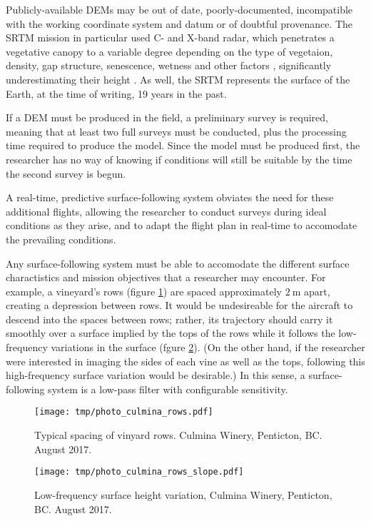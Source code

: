 \documentclass[doc]{apa6}
\begin{document}
Publicly-available DEMs may be out of date, poorly-documented, incompatible with the working coordinate system and datum or of doubtful provenance. The SRTM mission in particular used C- and X-band radar, which penetrates a vegetative canopy to a variable degree depending on the type of vegetaion, density, gap structure, senescence, wetness and other factors \parencite{Miliaresis2009}, significantly underestimating their height \parencite{Sexton2009}. As well, the SRTM represents the surface of the Earth, at the time of writing, 19 years in the past. 

If a DEM must be produced in the field, a preliminary survey is required, meaning that at least two full surveys must be conducted, plus the processing time required to produce the model. Since the model must be produced first, the researcher has no way of knowing if conditions will still be suitable by the time the second survey is begun. 

A real-time, predictive surface-following system obviates the need for these additional flights, allowing the researcher to conduct surveys during ideal conditions as they arise, and to adapt the flight plan in real-time to accomodate the prevailing conditions.

Any surface-following system must be able to accomodate the different surface charactistics and mission objectives that a researcher may encounter. For example, a vineyard's rows (figure \ref{fig:photo_culmina_rows}) are spaced approximately $\SI{2}\m$ apart, creating a depression between rows. It would be undesireable for the aircraft to descend into the spaces between rows; rather, its trajectory should carry it smoothly over a surface implied by the tops of the rows while it follows the low-frequency variations in the surface (fgure \ref{fig:photo_culmina_rows_slope}). (On the other hand, if the researcher were interested in imaging the sides of each vine as well as the tops, following this high-frequency surface variation would be desirable.) In this sense, a surface-following system is a low-pass filter with configurable sensitivity. 

\begin{figure} %
\texttt{[image: tmp/photo\_culmina\_rows.pdf]} 
\caption{Typical spacing of vinyard rows. Culmina Winery, Penticton, BC. August 2017.}
\label{fig:photo_culmina_rows}
\end{figure}

\begin{figure} %
\texttt{[image: tmp/photo\_culmina\_rows\_slope.pdf]} 
\caption{Low-frequency surface height variation, Culmina Winery, Penticton, BC. August 2017.}
\label{fig:photo_culmina_rows_slope}
\end{figure}
\end{document}
